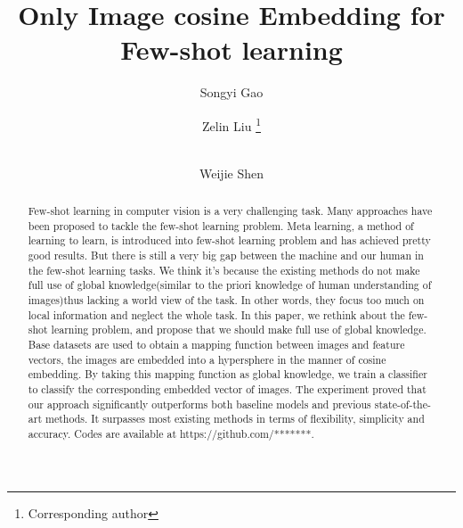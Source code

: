 \documentclass[runningheads]{llncs}
\begin{document}
%
\title{Only Image cosine Embedding for Few-shot learning}
%
%
\author{Songyi Gao \and
Zelin Liu \thanks{Corresponding author}  \and \\
Weijie Shen}
%
%

%
\maketitle              %
%
\begin{abstract}
    Few-shot learning in computer vision is a very challenging task. Many approaches have been proposed to tackle the few-shot learning problem. Meta learning, a method of learning to learn, is introduced into few-shot learning problem and has achieved pretty good results. But there is still a very big gap between the machine and our human in the few-shot learning tasks. We think it’s because the existing methods do not make full use of global knowledge(similar to the priori knowledge of human understanding of images)thus lacking a world view of the task. In other words, they focus too much on local information and neglect the whole task. In this paper, we rethink about the few-shot learning problem, and propose that we should make full use of global knowledge. Base datasets are used to obtain a mapping function between images and feature vectors, the images are embedded into a hypersphere in the manner of cosine embedding. By taking this mapping function as global knowledge, we train a classifier to classify the corresponding embedded vector of images. The experiment proved that our approach significantly outperforms both baseline models and previous state-of-the-art methods. It surpasses most existing methods in terms of flexibility, simplicity and accuracy. Codes are available at https://github.com/*******.
\end{abstract}
\end{document}
